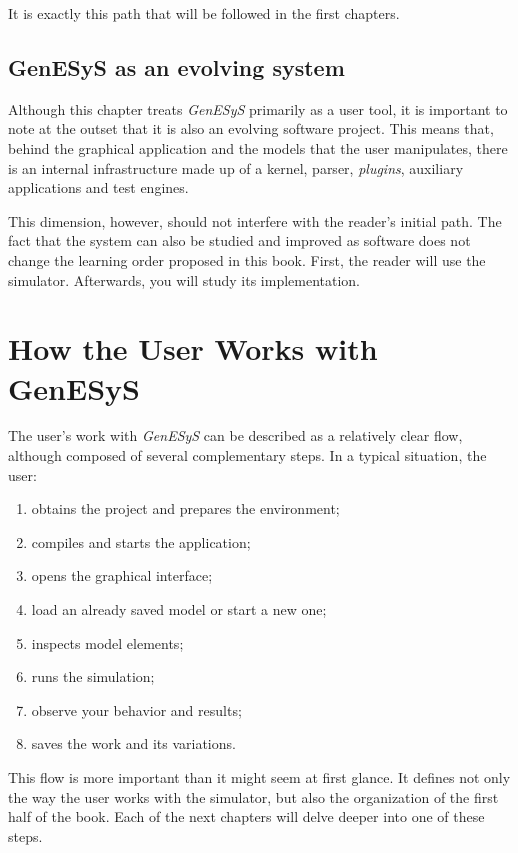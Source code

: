 It is exactly this path that will be followed in the first chapters.

\subsection{GenESyS as an evolving system}
\label{subsec:cap1_genesys_sistema_evolucao}

Although this chapter treats \textit{GenESyS} primarily as a user tool, it is important to note at the outset that it is also an evolving software project. This means that, behind the graphical application and the models that the user manipulates, there is an internal infrastructure made up of a kernel, parser, \textit{plugins}, auxiliary applications and test engines.

This dimension, however, should not interfere with the reader's initial path. The fact that the system can also be studied and improved as software does not change the learning order proposed in this book. First, the reader will use the simulator. Afterwards, you will study its implementation.

\section{How the User Works with GenESyS}
\label{sec:cap1_como_usuario_trabalha}

The user's work with \textit{GenESyS} can be described as a relatively clear flow, although composed of several complementary steps. In a typical situation, the user:

\begin{enumerate}
\item obtains the project and prepares the environment;
\item compiles and starts the application;
\item opens the graphical interface;
\item load an already saved model or start a new one;
\item inspects model elements;
\item runs the simulation;
\item observe your behavior and results;
\item saves the work and its variations.
\end{enumerate}

This flow is more important than it might seem at first glance. It defines not only the way the user works with the simulator, but also the organization of the first half of the book. Each of the next chapters will delve deeper into one of these steps.

